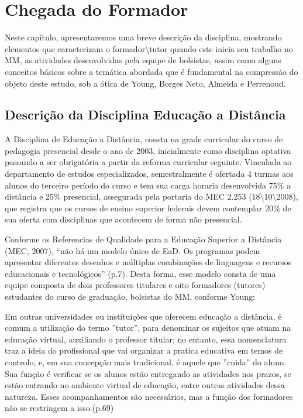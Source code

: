 \chapter{Chegada do Formador}

Neste capítulo, apresentaremos uma breve descrição da disciplina, mostrando elementos que caracterizam o formador\textbackslash{}tutor quando este inicia seu trabalho no MM, as atividades desenvolvidas pela equipe de bolsistas, assim como alguns conceitos básicos sobre a temática abordada que é fundamental na compressão do objeto deste estudo, sob a ótica de Young, Borges Neto, Almeida e Perrenoud.

\section{Descrição da Disciplina Educação a Distância}

A Disciplina de Educação a Distância, consta na grade curricular do curso de pedagogia presencial desde o ano de 2003, inicialmente como disciplina optativa passando a ser obrigatória a partir da reforma curricular seguinte. Vinculada ao departamento de estudos especializados, semestralmente é ofertada 4 turmas aos alunos do terceiro período do curso e tem sua carga horaria desenvolvida 75$\%$ a distância e 25$\%$ presencial, assegurada pela portaria do MEC 2.253 (18\textbackslash{}10\textbackslash{}2008), que registra que os cursos de ensino superior federais devem contemplar 20$\%$ de sua oferta com disciplinas que acontecem de forma não presencial.

Conforme os Referencias de Qualidade para a Educação Superior a Distância (MEC, 2007), ``não há um modelo único de EaD. Os programas podem apresentar diferentes desenhos e múltiplas combinações de linguagens e recursos educacionais e tecnológicos'' (p.7).  Desta forma, esse modelo consta de uma equipe composta de dois professores titulares e oito formadores (tutores) estudantes do curso de graduação, bolsistas do MM, conforme Young:

\begin{citacao}
Em outras universidades ou instituições que oferecem educação a distância, é comum a utilização do termo ''tutor'', para denominar os sujeitos que atuam na educação virtual, auxiliando o professor titular; no entanto, essa nomenclatura traz a ideia do profissional que vai organizar a pratica educativa em temos de controlo, e, em sua concepção mais tradicional, é aquele que ''cuida'' do aluno. Sua função é verificar se os alunos estão entregando as atividades nos prazos, se estão entrando no ambiente virtual de educação, entre outras atividades dessa natureza. Esses acompanhamentos são necessários, mas a função dos formadores não se restringem a isso.(p.69)
\end{citacao}

